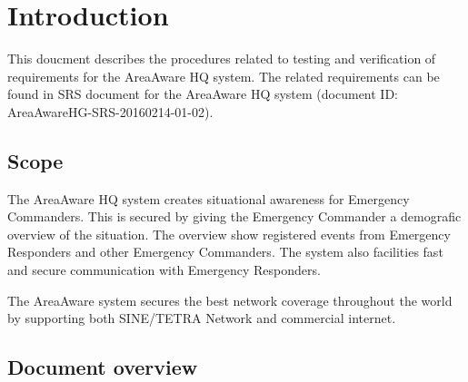 \label{chp_introduction}
\chapter{Introduction}
This doucment describes the procedures related to testing and verification of requirements for the AreaAware HQ system. The related requirements can be found in SRS document for the AreaAware HQ system (document ID: AreaAwareHG-SRS-20160214-01-02).

\section{Scope}

The AreaAware HQ system creates situational awareness for Emergency Commanders. This is secured by giving the Emergency Commander a demografic overview of the situation. The overview show registered events from Emergency Responders and other Emergency Commanders. The system also facilities fast and secure communication with Emergency Responders.

The AreaAware system secures the best network coverage throughout the world by supporting both SINE/TETRA Network and commercial internet.


\section{Document overview}
